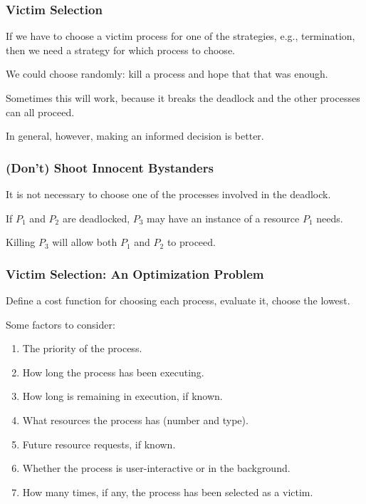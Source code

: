 \begin{frame}
	\frametitle{Victim Selection}

	If we have to choose a victim process for one of the strategies, e.g., termination, then we need a strategy for which process to choose.

	We could choose randomly: kill a process and hope that that was enough.

	Sometimes this will work, because it breaks the deadlock and the other processes can all proceed.

	In general, however, making an informed decision is better.

\end{frame}

\begin{frame}
	\frametitle{(Don't) Shoot Innocent Bystanders}

	It is not necessary to choose one of the processes involved in the deadlock.

	If $P_{1}$ and $P_{2}$ are deadlocked, $P_{3}$  may have an instance of a resource $P_{1}$ needs.

	Killing $P_{3}$ will allow both $P_{1}$ and $P_{2}$ to proceed.

\end{frame}

\begin{frame}
	\frametitle{Victim Selection: An Optimization Problem}

	Define a cost function for choosing each process, evaluate it, choose the lowest.

	Some factors to consider:

	\begin{enumerate}
		\item The priority of the process.
		\item How long the process has been executing.
		\item How long is remaining in execution, if known.
		\item What resources the process has (number and type).
		\item Future resource requests, if known.
		\item Whether the process is user-interactive or in the background.
		\item How many times, if any, the process has been selected as a victim.
	\end{enumerate}

\end{frame}

